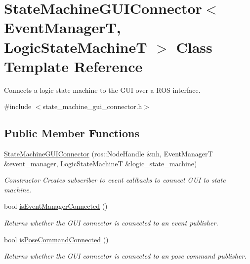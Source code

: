 \hypertarget{classStateMachineGUIConnector}{\section{State\-Machine\-G\-U\-I\-Connector$<$ Event\-Manager\-T, Logic\-State\-Machine\-T $>$ Class Template Reference}
\label{classStateMachineGUIConnector}
}


Connects a logic state machine to the G\-U\-I over a R\-O\-S interface.  




{\ttfamily \#include $<$state\-\_\-machine\-\_\-gui\-\_\-connector.\-h$>$}

\subsection*{Public Member Functions}
\begin{DoxyCompactItemize}
\item 
\hyperlink{classStateMachineGUIConnector_a0b17b16e283a7fd8215e5bc5a96fe511}{State\-Machine\-G\-U\-I\-Connector} (ros\-::\-Node\-Handle \&nh, Event\-Manager\-T \&event\-\_\-manager, Logic\-State\-Machine\-T \&logic\-\_\-state\-\_\-machine)
\begin{DoxyCompactList}\small\item\em Constructor Creates subscriber to event callbacks to connect G\-U\-I to state machine. \end{DoxyCompactList}\item 
bool \hyperlink{classStateMachineGUIConnector_a41ccee1af3a8f99ca533694ebdf3085c}{is\-Event\-Manager\-Connected} ()
\begin{DoxyCompactList}\small\item\em Returns whether the G\-U\-I connector is connected to an event publisher. \end{DoxyCompactList}\item 
bool \hyperlink{classStateMachineGUIConnector_a4c321da086299de9c33583255c4666f3}{is\-Pose\-Command\-Connected} ()
\begin{DoxyCompactList}\small\item\em Returns whether the G\-U\-I connector is connected to an pose command publisher. \end{DoxyCompactList}\end{DoxyCompactItemize}


